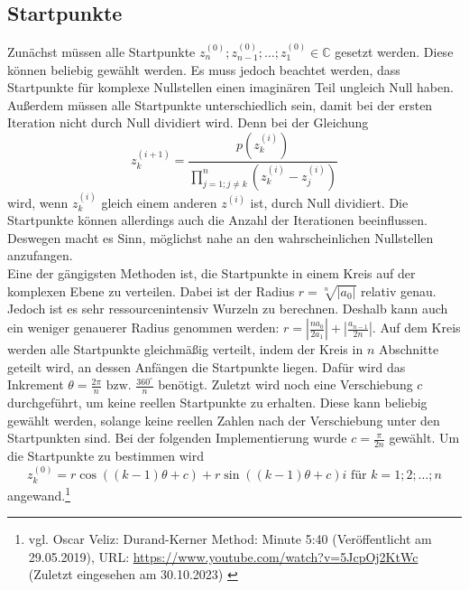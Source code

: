 \documentclass[12pt]{article}
\begin{document}
\subsection{Startpunkte}
Zunächst müssen alle Startpunkte $z_n^{(0)};z_{n-1}^{(0)};\dots;z_1^{(0)} \in \mathbb{C}$ gesetzt werden. Diese können beliebig gewählt werden. Es muss jedoch beachtet werden, dass Startpunkte für komplexe Nullstellen einen imaginären Teil ungleich Null haben. Außerdem müssen alle Startpunkte unterschiedlich sein, damit bei der ersten Iteration nicht durch Null dividiert wird.
Denn bei der Gleichung
\begin{equation*}
    z_k^{(i+1)} = \frac{p(z_{k}^{(i)})}{\prod_{j=1;j\neq k}^{n}(z_{k}^{(i)}-z_j^{(i)})}
\end{equation*}
wird, wenn $z_{k}^{(i)}$ gleich einem anderen $z^{(i)}$ ist, durch Null dividiert.
Die Startpunkte können allerdings auch die Anzahl der Iterationen beeinflussen. Deswegen macht es Sinn, möglichst nahe an den wahrscheinlichen Nullstellen anzufangen.\\
Eine der gängigsten Methoden ist, die Startpunkte in einem Kreis auf der komplexen Ebene zu verteilen. Dabei ist der Radius $r = \sqrt[n]{|a_0|}$ relativ genau. Jedoch ist es sehr ressourcenintensiv Wurzeln zu berechnen. Deshalb kann auch ein weniger genauerer Radius genommen werden: $r = |\frac{na_0}{2a_1}| + |\frac{a_{n-1}}{2n}|$.
Auf dem Kreis werden alle Startpunkte gleichmäßig verteilt, indem der Kreis in $n$ Abschnitte geteilt wird, an dessen Anfängen die Startpunkte liegen. Dafür wird das Inkrement $\theta = \frac{2\pi}{n} \text{ bzw. } \frac{360^\circ}{n}$ benötigt. Zuletzt wird noch eine Verschiebung $c$ durchgeführt, um keine reellen Startpunkte zu erhalten. Diese kann beliebig gewählt werden, solange keine reellen Zahlen nach der Verschiebung unter den Startpunkten sind. Bei der folgenden Implementierung wurde $c = \frac{\pi}{2n}$ gewählt.
Um die Startpunkte zu bestimmen wird 
\[z_{k}^{(0)} = r\cos((k-1)\theta+c)+r\sin((k-1)\theta+c)i \text{ für } k=1;2;\dots;n\]
angewand.\footnote{
    vgl. Oscar Veliz: Durand-Kerner Method: Minute 5:40 (Veröffentlicht am 29.05.2019), URL: \url{https://www.youtube.com/watch?v=5JcpOj2KtWc} (Zuletzt eingesehen am 30.10.2023) \label{ftn:OscarVilez,5:40}
}
\end{document}

